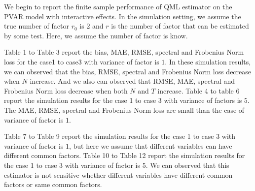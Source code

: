 \documentclass[12pt,a4paper,hyperref]{article}
\begin{document}
We begin to report the finite sample performance of QML estimator  on the PVAR model with interactive effects.  In the simulation setting, we assume the true number of factor $r_{0}$ is $2$ and $r$ is the number of factor that can be estimated by  some test. Here, we assume the number of factor is know.

Table 1 to Table 3 report the bias, MAE, RMSE,  spectral and Frobenius Norm loss for the case1 to case3 with variance of factor is $1$. In these simulation results, we can observed that the bias, RMSE, spectral and Frobenius Norm loss decrease when $N$ increase. And we also can observed that RMSE, MAE,  spectral and Frobenius Norm loss decrease when both $N$ and $T$ increase. Table 4 to table 6 report the simulation results for the case 1 to case 3 with variance of factors is $5$. The MAE, RMSE, spectral and Frobenius Norm loss are small than the case of variance of factor is $1$.

Table 7 to Table 9 report the simulation results for the case 1 to case 3 with variance of factor is $1$, but here we assume that different variables can have different common factors. Table 10 to Table 12 report the simulation results for the case 1 to case 3 with variance of factor is $5$. We can observed that this estimator is not sensitive whether different variables have different common factors or same common factors.
\end{document}
